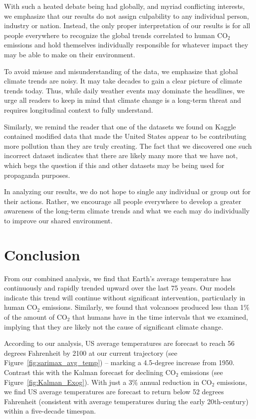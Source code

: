 \documentclass[11pt]{amsart}
\begin{document}
With such a heated debate being had globally, and myriad conflicting interests, we emphasize that our results do not assign culpability to any individual person, industry or nation.
Instead, the only proper interpretation of our results is for all people everywhere to recognize the global trends correlated to human CO$_2$ emissions and hold themselves individually responsible for whatever impact they may be able to make on their environment.

To avoid misuse and misunderstanding of the data, we emphasize that global climate trends are noisy.
It may take decades to gain a clear picture of climate trends today.
Thus, while daily weather events may dominate the headlines, we urge all readers to keep in mind that climate change is a long-term threat and requires longitudinal context to fully understand.

Similarly, we remind the reader that one of the datasets we found on Kaggle contained modified data that made the United States appear to be contributing more pollution than they are truly creating. The fact that we discovered one such incorrect dataset indicates that there are likely many more that we have not, which begs the question if this and other datasets may be being used for propaganda purposes.

In analyzing our results, we do not hope to single any individual or group out for their actions.
Rather, we encourage all people everywhere to develop a greater awareness of the long-term climate trends and what we each may do individually to improve our shared environment.


\section{Conclusion} 

\par From our combined analysis, we find that Earth's average temperature has continuously and rapidly trended upward over the last 75 years.
  Our models indicate this trend will continue without significant intervention, particularly in human CO$_2$ emissions. Similarly, we found that volcanoes produced less than 1\% of the amount of CO$_2$ that humans have in the time intervals that we examined, implying that they are likely not the cause of significant climate change.

\par According to our analysis, US average temperatures are forecast to reach 56 degrees Fahrenheit by 2100 at our current trajectory (see Figure~\ref{fig:sarimax_avg_temp}) -- marking a 4.5-degree increase from 1950.
  Contrast this with the Kalman forecast for declining CO$_2$ emissions (see Figure~\ref{fig:Kalman_Exog}).
  With just a 3\% annual reduction in CO$_2$ emissions, we find US average temperatures are forecast to return below 52 degrees Fahrenheit (consistent with average temperatures during the early 20th-century) within a five-decade timespan.
\end{document}
